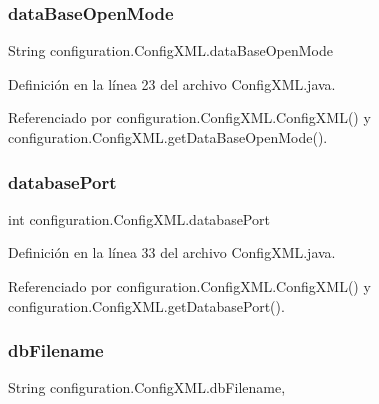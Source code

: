 \subsubsection{\texorpdfstring{dataBaseOpenMode}{dataBaseOpenMode}}
{\footnotesize\ttfamily String configuration.\+Config\+X\+M\+L.\+data\+Base\+Open\+Mode\hspace{0.3cm}{\ttfamily [private]}}



Definición en la línea 23 del archivo Config\+X\+M\+L.\+java.



Referenciado por configuration.\+Config\+X\+M\+L.\+Config\+X\+M\+L() y configuration.\+Config\+X\+M\+L.\+get\+Data\+Base\+Open\+Mode().

\mbox{\label{classconfiguration_1_1_config_x_m_l_a3766a24ed4f1ffda3f6af14b90100656}} 
\subsubsection{\texorpdfstring{databasePort}{databasePort}}
{\footnotesize\ttfamily int configuration.\+Config\+X\+M\+L.\+database\+Port\hspace{0.3cm}{\ttfamily [private]}}



Definición en la línea 33 del archivo Config\+X\+M\+L.\+java.



Referenciado por configuration.\+Config\+X\+M\+L.\+Config\+X\+M\+L() y configuration.\+Config\+X\+M\+L.\+get\+Database\+Port().

\mbox{\label{classconfiguration_1_1_config_x_m_l_a421b678aff5893a1927f5257b1becb14}} 
\subsubsection{\texorpdfstring{dbFilename}{dbFilename}}
{\footnotesize\ttfamily String configuration.\+Config\+X\+M\+L.\+db\+Filename\hspace{0.3cm}{\ttfamily [static]}, {\ttfamily [private]}}



